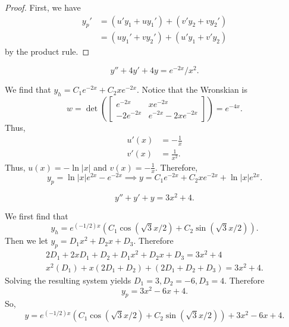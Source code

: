 \begin{proof}
    First, we have
    \begin{align*}
        y_p' &= \left(u'y_1+uy_1'\right) + \left(v'y_2+vy_2'\right) \\
             &= \left(uy_1'+vy_2'\right) + \left(u'y_1+v'y_2\right)
    \end{align*}
    by the product rule.
\end{proof}
\begin{example}
    $$y''+4y'+4y = e^{-2x}/x^2.$$
\end{example}
\begin{soln}
    We find that $y_h = C_1e^{-2x} + C_2xe^{-2x}$. Notice that the Wronskian
    is $$w =\det \left( \begin{bmatrix} e^{-2x} & xe^{-2x} \\ -2e^{-2x} & e^{-2x}-2xe^{-2x}
    \end{bmatrix}\right) = e^{-4x}.$$ Thus,
    \begin{align*}
        u'(x) &= -\frac{1}{x} \\
        v'(x) &= \frac{1}{x^2}.
    \end{align*}
    Thus, $u(x)=-\ln|x|$ and $v(x) = -\frac{1}{x}$. Therefore,
    $$y_p = \ln |x|e^{2x} - e^{-2x} \implies \boxed{y=C_1e^{-2x}+C_2xe^{-2x}+\ln|x|e^{2x}}.$$
\end{soln}
\begin{example}
    $$y''+y'+y = 3x^2+4.$$
\end{example}
\begin{soln}
    We first find that $$y_h = e^{(-1/2)x}\left( C_1\cos(\sqrt{3}x/2)+C_2\sin(\sqrt{3}x/2)\right).$$
    Then we let $y_p = D_1x^2+D_2x+D_3$. Therefore
    \begin{align*}
        2D_1+2xD_1+D_2+D_1x^2+D_2x+D_3 = 3x^2+4 \\
        x^2\left(D_1\right)+x\left(2D_1+D_2\right)+\left(2D_1+D_2+D_3\right)=3x^2+4.
    \end{align*}
    Solving the resulting system yields $D_1 = 3, D_2 = -6, D_3 = 4$.
    Therefore $$y_p = 3x^2-6x+4.$$ So,
    $$\boxed{y = e^{(-1/2)x}\left( C_1\cos(\sqrt{3}x/2)+C_2\sin(\sqrt{3}x/2)\right)+3x^2-6x+4}.$$
\end{soln}

